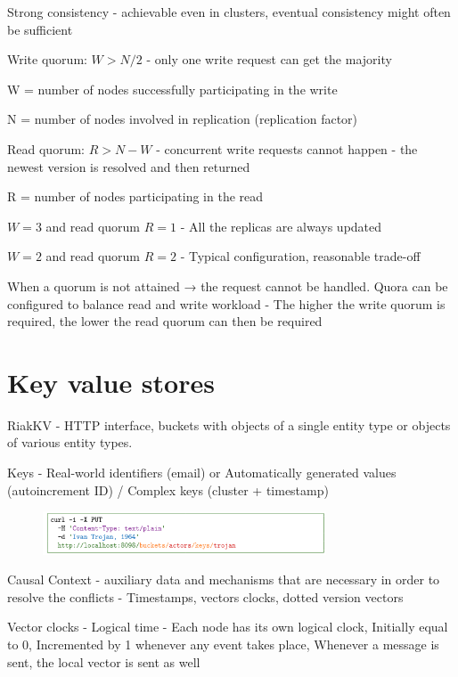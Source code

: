 Strong consistency - achievable even in clusters, eventual consistency might often be sufficient

Write quorum: $W > N/2$ - only one write request can get the majority

W = number of nodes successfully participating in the write

N = number of nodes involved in replication (replication factor)

Read quorum: $R >N - W$ - concurrent write requests cannot happen - the newest version is resolved and then returned

R = number of nodes participating in the read


$W = 3$ and read quorum $R = 1$ - All the replicas are always updated

$W = 2$ and read quorum $R = 2$ - Typical configuration, reasonable trade-off


When a quorum is not attained → the request cannot be handled. Quora can be configured to balance read and write workload - The higher the write quorum is required, the lower the read quorum can then be required

\section{Key value stores}
RiakKV - HTTP interface, buckets with objects of a single entity type or objects of various entity types.

Keys - Real-world identifiers (email) or Automatically generated values (autoincrement ID) / Complex keys  (cluster + timestamp)

\begin{figure}[ht!]
\centering
\includegraphics[width=0.75\textwidth]{oborove/DS2/img/riak.png}
\end{figure}


Causal Context - auxiliary data and mechanisms that are necessary in order to resolve the conflicts - Timestamps, vectors clocks, dotted version vectors

Vector clocks - Logical time - Each node has its own logical clock, Initially equal to 0, Incremented by 1 whenever any event takes place, Whenever a message is sent, the local vector is sent as well

